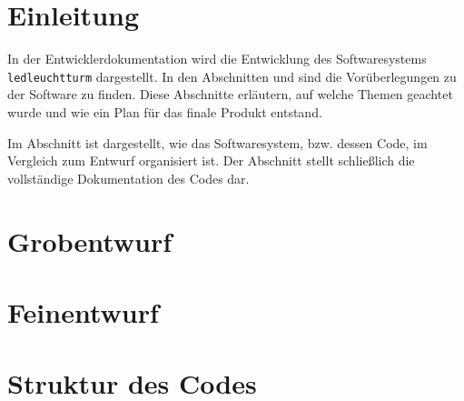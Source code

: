 \documentclass{scrartcl}
\date{}
\begin{document}
\maketitle
\tableofcontents
\renewcommand{\maketitle}{}
\renewcommand{\tableofcontents}{}

\section*{Einleitung}

In der Entwicklerdokumentation wird die Entwicklung des Softwaresystems \texttt{ledleuchtturm} dargestellt. In den Abschnitten  und  sind die Vorüberlegungen zu der Software zu finden. Diese Abschnitte erläutern, auf welche Themen geachtet wurde und wie ein Plan für das finale Produkt entstand.

Im Abschnitt  ist dargestellt, wie das Softwaresystem, bzw. dessen Code, im Vergleich zum Entwurf organisiert ist. Der Abschnitt  stellt schließlich die vollständige Dokumentation des Codes dar.


\section{Grobentwurf}
\label{grobentw}


\clearpage
\section{Feinentwurf}
\label{feinentw}


\clearpage
\section{Struktur des Codes}
\label{strukt}

\end{document}
